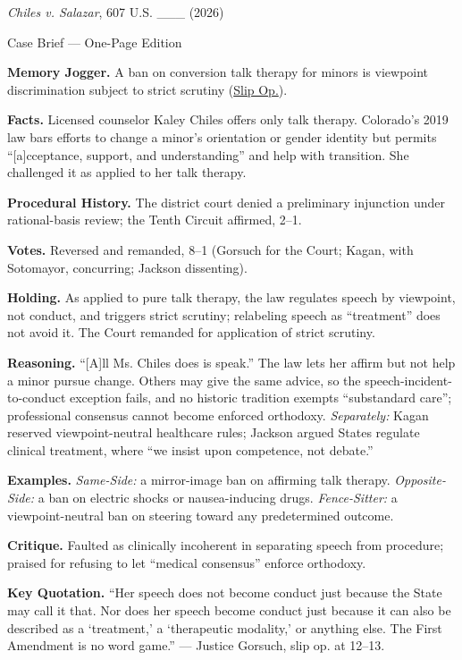 \documentclass[12pt]{article}
\begin{document}
\begin{center}
{\Large \textit{Chiles v. Salazar}, 607 U.S. \_\_\_ (2026)\par}
\vspace{0.3em}
{\normalsize Case Brief --- One-Page Edition\par}
\end{center}

\textbf{Memory Jogger.} A ban on conversion talk therapy for minors is viewpoint discrimination subject to strict scrutiny (\href{https://www.supremecourt.gov/opinions/25pdf/24-539_fd9g.pdf}{Slip Op.}).

\textbf{Facts.} Licensed counselor Kaley Chiles offers only talk therapy. Colorado's 2019 law bars efforts to change a minor's orientation or gender identity but permits ``[a]cceptance, support, and understanding'' and help with transition. She challenged it as applied to her talk therapy.

\textbf{Procedural History.} The district court denied a preliminary injunction under rational-basis review; the Tenth Circuit affirmed, 2--1.

\textbf{Votes.} Reversed and remanded, 8--1 (Gorsuch for the Court; Kagan, with Sotomayor, concurring; Jackson dissenting).

\textbf{Holding.} As applied to pure talk therapy, the law regulates speech by viewpoint, not conduct, and triggers strict scrutiny; relabeling speech as ``treatment'' does not avoid it. The Court remanded for application of strict scrutiny.

\textbf{Reasoning.} ``[A]ll Ms. Chiles does is speak.'' The law lets her affirm but not help a minor pursue change. Others may give the same advice, so the speech-incident-to-conduct exception fails, and no historic tradition exempts ``substandard care''; professional consensus cannot become enforced orthodoxy. \emph{Separately:} Kagan reserved viewpoint-neutral healthcare rules; Jackson argued States regulate clinical treatment, where ``we insist upon competence, not debate.''

\textbf{Examples.} \emph{Same-Side:} a mirror-image ban on affirming talk therapy. \emph{Opposite-Side:} a ban on electric shocks or nausea-inducing drugs. \emph{Fence-Sitter:} a viewpoint-neutral ban on steering toward any predetermined outcome.

\textbf{Critique.} Faulted as clinically incoherent in separating speech from procedure; praised for refusing to let ``medical consensus'' enforce orthodoxy.

\textbf{Key Quotation.} ``Her speech does not become conduct just because the State may call it that. Nor does her speech become conduct just because it can also be described as a `treatment,' a `therapeutic modality,' or anything else. The First Amendment is no word game.'' --- Justice Gorsuch, slip op. at 12--13.
\end{document}

